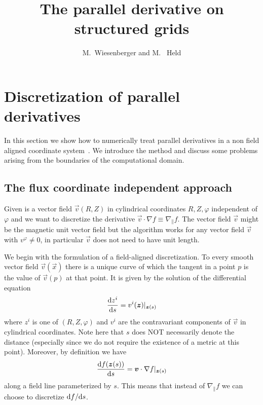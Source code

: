 






\title{The parallel derivative on structured grids}
\author{M.~Wiesenberger and M.~ Held}

\maketitle
\section{Discretization of parallel derivatives} \label{sec:parallel}
In this section we show how to numerically treat parallel derivatives in a non field
aligned coordinate system~\cite{Held2016}.
We introduce the method %
and discuss some problems arising from the boundaries of the computational domain.

\subsection{The flux coordinate independent approach} \label{sec:parallela}
Given is a vector field $\vec v(R,Z)$ in cylindrical coordinates $R,Z,\varphi$ independent of $\varphi$ and we want to
discretize the derivative $\vec v \cdot\nabla f \equiv \nabla_\parallel f$.
The vector field $\vec v$ might be the magnetic unit vector field but the algorithm works
for any vector field $\vec v$ with $v^\varphi\neq 0$, in particular $\vec v$ does not need
to have unit length.

We begin with the formulation of a field-aligned discretization.
To every smooth vector field $\vec v(\vec x)$ there is a unique curve of which the
tangent in a point $p$ is the value of $\vec v(p)$ at that point. It is given by
the solution of the differential equation
\begin{align}
  \frac{\mathrm{d} z^i}{\mathrm{d} s} = v^i({\boldsymbol{z}})|_{{\boldsymbol{z}}(s)}
    \label{eq:integralcurve}
\end{align}
where $z^i$ is one of $(R, Z, \varphi)$ and $v^i$ are the contravariant components
of $\vec v$ in cylindrical coordinates.
Note here that $s$ does NOT necessarily denote the distance
(especially since we do not require the existence of a metric at this point).
Moreover, by definition we have
\begin{align}
    \frac{\mathrm{d} f({\boldsymbol{z}}(s))}{\mathrm{d} s} = {\boldsymbol{v}}\cdot \nabla f|_{{\boldsymbol{z}}(s)}
    \label{}
\end{align}
along a field line parameterized by $s$.
This means that instead of $\nabla_\parallel f$ we can choose to discretize ${\mathrm{d} f}/{\mathrm{d} s}$.

